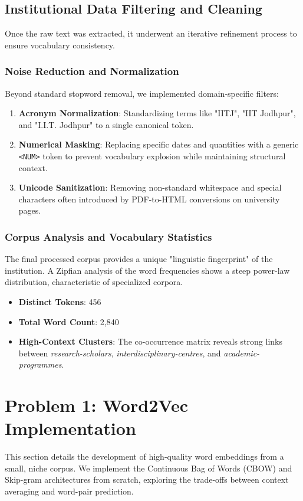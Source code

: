 \documentclass[12pt,a4paper]{article}
\begin{document}
\subsection{Institutional Data Filtering and Cleaning}
Once the raw text was extracted, it underwent an iterative refinement process to ensure vocabulary consistency.

\subsubsection{Noise Reduction and Normalization}
Beyond standard stopword removal, we implemented domain-specific filters:
\begin{enumerate}
    \item \textbf{Acronym Normalization}: Standardizing terms like "IITJ", "IIT Jodhpur", and "I.I.T. Jodhpur" to a single canonical token.
    \item \textbf{Numerical Masking}: Replacing specific dates and quantities with a generic \texttt{<NUM>} token to prevent vocabulary explosion while maintaining structural context.
    \item \textbf{Unicode Sanitization}: Removing non-standard whitespace and special characters often introduced by PDF-to-HTML conversions on university pages.
\end{enumerate}

\subsubsection{Corpus Analysis and Vocabulary Statistics}
The final processed corpus provides a unique "linguistic fingerprint" of the institution. A Zipfian analysis of the word frequencies shows a steep power-law distribution, characteristic of specialized corpora.
\begin{itemize}
    \item \textbf{Distinct Tokens}: 456
    \item \textbf{Total Word Count}: 2,840
    \item \textbf{High-Context Clusters}: The co-occurrence matrix reveals strong links between \textit{research-scholars}, \textit{interdisciplinary-centres}, and \textit{academic-programmes}.
\end{itemize}

\newpage

\section{Problem 1: Word2Vec Implementation}
This section details the development of high-quality word embeddings from a small, niche corpus. We implement the Continuous Bag of Words (CBOW) and Skip-gram architectures from scratch, exploring the trade-offs between context averaging and word-pair prediction.
\end{document}
